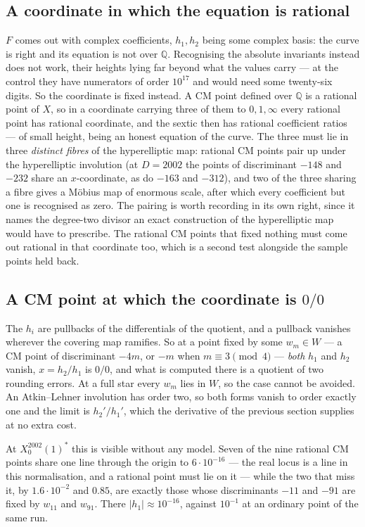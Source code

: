 \documentclass[11pt,reqno]{amsart}
\theoremstyle{plain}
\theoremstyle{definition}
\newcommand{\Q}{\mathbb{Q}}
\begin{document}
\subsection*{A coordinate in which the equation is rational}
$F$ comes out with complex coefficients, $h_1,h_2$ being some complex basis: the curve is right
and its equation is not over $\Q$. Recognising the absolute invariants instead does not work,
their heights lying far beyond what the values carry --- at the control they have numerators of
order $10^{17}$ and would need some twenty-six digits. So the coordinate is fixed instead. A CM
point defined over $\Q$ is a rational point of $X$, so in a coordinate carrying three of them to
$0,1,\infty$ every rational point has rational coordinate, and the sextic then has rational
coefficient ratios --- of small height, being an honest equation of the curve. The three must lie
in three \emph{distinct fibres} of the hyperelliptic map: rational CM points pair up under the
hyperelliptic involution (at $D=2002$ the points of discriminant $-148$ and $-232$ share an
$x$-coordinate, as do $-163$ and $-312$), and two of the three sharing a fibre gives a M\"obius
map of enormous scale, after which every coefficient but one is recognised as zero. The pairing is
worth recording in its own right, since it names the degree-two divisor an exact construction of
the hyperelliptic map would have to prescribe. The rational CM
points that fixed nothing must come out rational in that coordinate too, which is a second test
alongside the sample points held back.

\subsection*{A CM point at which the coordinate is $0/0$}
The $h_i$ are pullbacks of the differentials of the quotient, and a pullback vanishes wherever the
covering map ramifies. So at a point fixed by some $w_m\in W$ --- a CM point of discriminant
$-4m$, or $-m$ when $m\equiv3\pmod 4$ --- \emph{both} $h_1$ and $h_2$ vanish, $x=h_2/h_1$ is
$0/0$, and what is computed there is a quotient of two rounding errors. At a full star every $w_m$
lies in $W$, so the case cannot be avoided. An Atkin--Lehner involution has order two, so both
forms vanish to order exactly one and the limit is $h_2'/h_1'$, which the derivative of the
previous section supplies at no extra cost.

At $X_0^{2002}(1)^*$ this is visible without any model. Seven of the nine rational CM points share
one line through the origin to $6\cdot10^{-16}$ --- the real locus is a line in this normalisation,
and a rational point must lie on it --- while the two that miss it, by $1.6\cdot10^{-2}$ and
$0.85$, are exactly those whose discriminants $-11$ and $-91$ are fixed by $w_{11}$ and $w_{91}$.
There $|h_1|\approx10^{-16}$, against $10^{-1}$ at an ordinary point of the same run.
\end{document}

